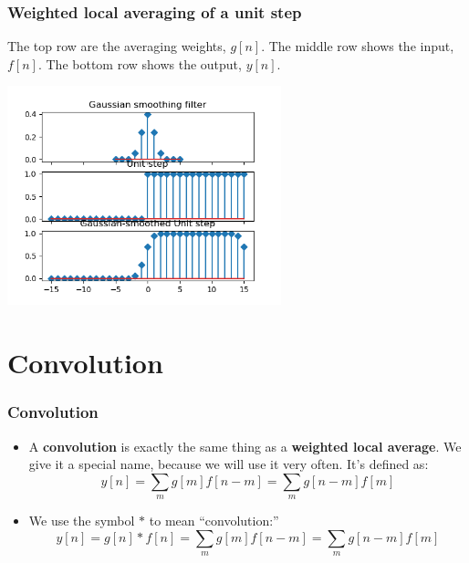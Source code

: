 \documentclass{beamer}
\begin{document}
\begin{frame}
  \frametitle{Weighted local averaging of a unit step} The top row are
  the averaging weights, $g[n]$.  The middle row shows the input,
  $f[n]$.  The bottom row shows the output, $y[n]$.
  \centerline{\includegraphics[height=2.5in]{mp3fig6.png}}
\end{frame}

\section[Convolution]{Convolution}
\setcounter{subsection}{1}

\begin{frame}
  \frametitle{Convolution}
  \begin{itemize}
  \item A {\bf convolution} is exactly the same thing as a {\bf weighted local average}.
    We give it a special name, because we will use it very often.  It's defined as:
    \[
    y[n] = \sum_m g[m] f[n-m] = \sum_m g[n-m] f[m]
    \]
  \item 
    We use the symbol $\ast$ to mean ``convolution:''
    \[
    y[n]=g[n]\ast f[n] = \sum_m g[m] f[n-m] = \sum_m g[n-m] f[m]
    \]
  \end{itemize}
\end{frame}
\end{document}
